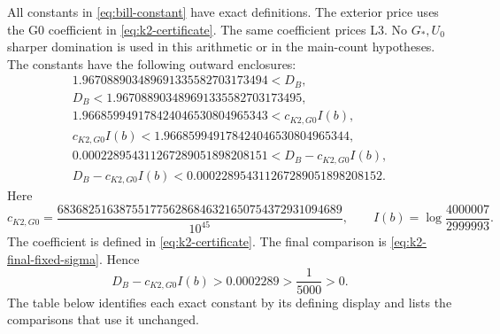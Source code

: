 All constants in \eqref{eq:bill-constant} have exact definitions.
The exterior price uses the G0 coefficient in
\eqref{eq:k2-certificate}.
The same coefficient prices L3. No $G_*,U_0$ sharper domination
is used in this arithmetic or in the main-count hypotheses.
The constants have the following outward enclosures:
\begin{equation}\label{eq:bill-numeric-enclosures}
\begin{gathered}
 1.967088903489691335582703173494<D_B,\\
 D_B<1.967088903489691335582703173495,\\[2pt]
 1.966859949178424046530804965343<c_{K2,G0}I(b),\\
 c_{K2,G0}I(b)<1.966859949178424046530804965344,\\[2pt]
 0.000228954311267289051898208151<D_B-c_{K2,G0}I(b),\\
 D_B-c_{K2,G0}I(b)<0.000228954311267289051898208152.
\end{gathered}
\end{equation}
Here
\begin{equation}\label{eq:bill-price-definition}
 c_{K2,G0}=\frac{6836825163875517756286846321650754372931094689}{10^{45}},
 \qquad I(b)=\log\frac{4000007}{2999993}.
\end{equation}
The coefficient is defined in \eqref{eq:k2-certificate}.
The final comparison is \eqref{eq:k2-final-fixed-sigma}.
Hence
\begin{equation}\label{eq:bill-margin-simple}
 D_B-c_{K2,G0}I(b)>0.0002289>\frac1{5000}>0.
\end{equation}
The table below identifies each exact constant by its defining display and
lists the comparisons that use it unchanged.
\begingroup
\small
\renewcommand{\arraystretch}{1.3}
